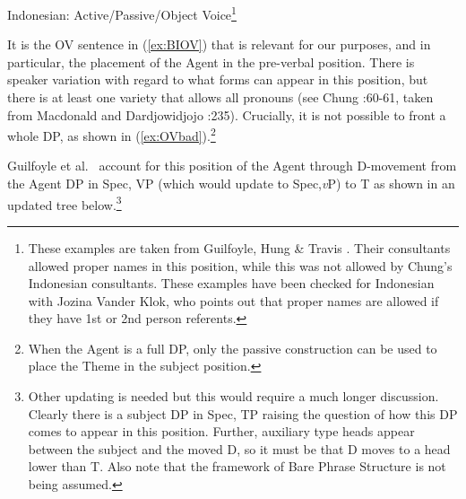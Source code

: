 \documentclass[output=paper,colorlinks,citecolor=brown,
]{langscibook}
\begin{document}
\ea Indonesian: Active/Passive/Object Voice\footnote{These examples are taken from Guilfoyle, Hung \& Travis \citeyearpar{Guilfoyle:1992}.  Their consultants allowed proper names in this position, while this was not allowed by Chung's Indonesian consultants.  These examples have been checked for Indonesian with Jozina Vander Klok, who points out that proper names are allowed if they have 1st or 2nd person referents.}
    \z
\z

It is the OV sentence in (\ref{ex:BIOV})  that is relevant for our purposes, and in particular, the placement of the Agent in the pre-verbal position.   There is speaker variation with regard to what forms can appear in this position, but there is at least one variety that allows all pronouns (see Chung \citeyear{Chung:1976a}:60-61, taken from  Macdonald and Dardjowidjojo \citeyear{Macdonald:1967}:235).  Crucially, it is not possible to front a whole DP, as shown in (\ref{ex:OVbad}).\footnote{When the Agent is a full DP, only the passive construction can be used to place the Theme in the subject position.} 

Guilfoyle et al.\ \citeyearpar{Guilfoyle:1992} account for this position of the Agent through D-movement from the Agent DP in Spec, VP (which would update to Spec,\textit{v}P) to T as shown in an updated tree below.\footnote{Other updating is needed but this would require a much longer discussion.  Clearly there is a subject DP in Spec, TP raising the question of how this DP comes to appear in this position.  Further, auxiliary type heads appear between the subject and the moved D, so it must be that D  moves to a head lower than T. Also note that the framework of Bare Phrase Structure is not being assumed.} 
\end{document}

